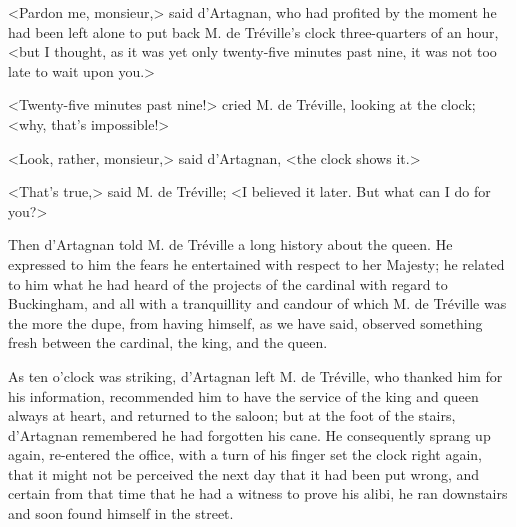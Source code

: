 <Pardon me, monsieur,> said d'Artagnan, who had profited by the moment he had been left alone to put back M. de Tréville's clock three-quarters of an hour, <but I thought, as it was yet only twenty-five minutes past nine, it was not too late to wait upon you.> 

<Twenty-five minutes past nine!> cried M. de Tréville, looking at the clock; <why, that's impossible!> 

<Look, rather, monsieur,> said d'Artagnan, <the clock shows it.> 

<That's true,> said M. de Tréville; <I believed it later. But what can I do for you?> 

Then d'Artagnan told M. de Tréville a long history about the queen. He expressed to him the fears he entertained with respect to her Majesty; he related to him what he had heard of the projects of the cardinal with regard to Buckingham, and all with a tranquillity and candour of which M. de Tréville was the more the dupe, from having himself, as we have said, observed something fresh between the cardinal, the king, and the queen. 

As ten o'clock was striking, d'Artagnan left M. de Tréville, who thanked him for his information, recommended him to have the service of the king and queen always at heart, and returned to the saloon; but at the foot of the stairs, d'Artagnan remembered he had forgotten his cane. He consequently sprang up again, re-entered the office, with a turn of his finger set the clock right again, that it might not be perceived the next day that it had been put wrong, and certain from that time that he had a witness to prove his alibi, he ran downstairs and soon found himself in the street.